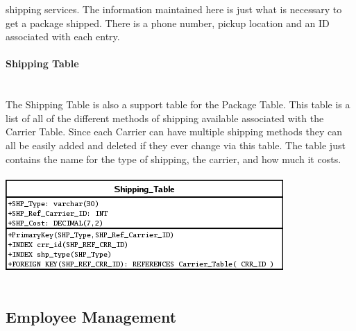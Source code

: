 \documentclass{report}
\begin{document}
        shipping services. The information maintained here is just what is necessary to get a package shipped.
        There is a phone number, pickup location and an ID associated with each entry.
        \\
        \\
        {\bf Shipping Table}\\
        \\
        \\
        The Shipping Table is also a support table for the Package Table. This table is a list of all of the
        different methods of shipping available associated with the Carrier Table. Since each Carrier can
        have multiple shipping methods they can all be easily added and deleted if they ever change via
        this table. The table just contains the name for the type of shipping, the carrier, and how much
        it costs.\\
        \\
        \includegraphics{Tables/ShippingTable.png}\\
        \\
        \subsection{Employee Management}
\end{document}
